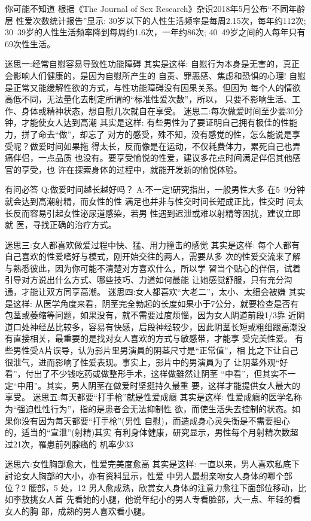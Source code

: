 \documentclass[12pt,UTF8]{ctexbook}
\begin{document}
你可能不知道
根据《The Journal of Sex Research》杂识2018年5月公布“不同年龄层
性爱次数统计报告”显示:
30岁以下的人性生活频率是每周2.15次，每年约112次;
30~39岁的人性生活频率降到每周约1.6次，一年约86次;
40~49岁之间的人每年只有69次性生活。

迷思一:经常自慰容易导致性功能障碍
其实是这样:
自慰行为本身是无害的，真正会影响人们健康的，是因为自慰所产生的
自责、罪恶感、焦虑和恐惧的心理!
自慰是正常又能缓解性欲的方式，与性功能障碍没有因果关系。但因为
每个人的情欲高低不同，无法量化去制定所谓的“标准性爱次数”，所以，
只要不影响生活、工作、身体或精神状态，想自慰几次就自在享受。
迷思二:每次做爱时间至少要30分钟，才能使女人达到高潮
其实是这样:
有些男性为了要证明自己拥有极佳的性能力，拼了命去“做”，却忘了
对方的感受，殊不知，没有感觉的性，怎么能说是享受呢？做爱时间如果拖
得太长，反而像是在运动，不仅耗费体力，累死自己也弄痛伴侣，一点品质
也没有。要享受愉悦的性爱，建议多花点时间满足伴侣其他感官的享受，也
许在探索身体的过程中，就能开发新的愉悦体验。

有问必答
Q:做爱时间越长越好吗？
A:不一定!研究指出，一般男性大多
在5~9分钟就会达到高潮射精，而女性的性
满足也并非与性交时间长短成正比，性交时
间太长反而容易引起女性泌尿道感染，若男
性遇到迟泄或难以射精等困扰，建议立即就
医，寻找正确的治疗方式。

迷思三:女人都喜欢做爱过程中快、猛、用力撞击的感觉
其实是这样:
每个人都有自己喜欢的性爱嗜好与模式，刚开始交往的两人，需要从多
次的性爱交流来了解与熟悉彼此，因为你可能不清楚对方喜欢什么，所以学
習当个贴心的伴侣，试着引导对方说出什么方式、哪些技巧、力道如何最能
让她感觉舒服，只有充分沟通，才能让双方同享高潮。
迷思四:女人都喜欢“大老二”，太小、太细会被嫌
其实是这样:
从医学角度来看，阴茎完全勃起的长度如果小于7公分，就要检查是否有
包茎或萎缩等问题，如果没有，就不需要过度烦惱，因为女人阴道前段1/3靠
近阴道口处神经丛比较多，容易有快感，后段神经较少，因此阴茎长短或粗细跟高潮没有直接相关，最重要的是找对女人喜欢的方式与敏感带，才能享
受完美性爱。
有些男性受A片误导，认为影片里男演員的阴茎尺寸是“正常值”，相
比之下让自己很泄气，进而影响了性爱表现。事实上，影片中的男演員为了
让阴茎外观“好看”，付出了不少钱吃药或做整形手术，这样做雖然让阴茎
“中看”，但其实不一定“中用”。其实，男人阴茎在做爱时坚挺持久最重
要，这样才能提供女人最大的享受。
迷思五:每天都要“打手枪”就是性爱成癮
其实是这样:
性爱成癮的医学名称为“强迫性性行为”，指的是患者会无法抑制性
欲，而使生活失去控制的状态。如果你没有因为每天都要“打手枪”(男性
自慰)，而造成身心灵失衡是不需要担心的，适当的“宣泄”(射精)其实
有利身体健康，研究显示，男性每个月射精次数超过21次，罹患前列腺癌的
机率少33%

迷思六:女性胸部愈大，性爱完美度愈高
其实是这样:
一直以来，男人喜欢私底下討论女人胸部的大小，亦有资料显示，性爱
中男人最想亲吻女人身体的哪个部位？2%
腰部，5%
处，12%
男人愈成熟，欣赏女人身体的注意力愈往下面部位移动，比如李敖挑女人首
先看她的小腿，他说年纪小的男人专看脸部，大一点、年轻的看女人的胸
部，成熟的男人喜欢看小腿。
\end{document}
